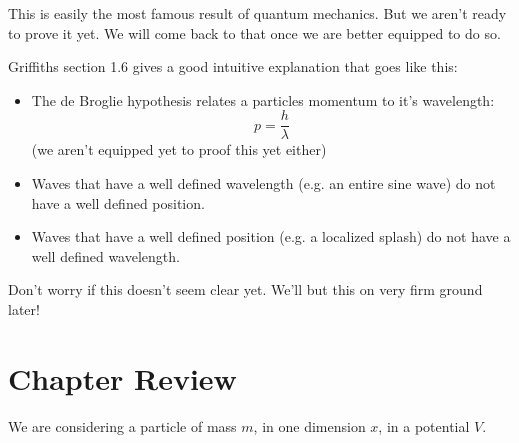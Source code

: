 \documentclass[12pt]{book}
\begin{document}
This is easily the most famous result of quantum mechanics.  But we aren't ready to prove it yet. We will come back to that once we are better equipped to do so.

Griffiths section 1.6 gives a good intuitive explanation that goes like this:
\begin{itemize}
\item The de Broglie hypothesis relates a particles momentum to it's wavelength:
\begin{equation}
p = \frac{h}{\lambda}
\end{equation}
(we aren't equipped yet to proof this yet either)
\item Waves that have a well defined wavelength (e.g. an entire sine wave) do not have a well defined position.
\item Waves that have a well defined position (e.g. a localized splash) do not have a well defined wavelength.
\end{itemize}

Don't worry if this doesn't seem clear yet.  We'll but this on very firm ground later!

\section{Chapter Review}

We are considering a particle of mass $m$, in one dimension $x$, in a potential $V$.
\end{document}
